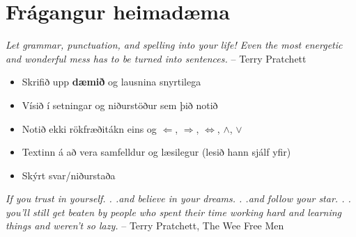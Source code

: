\documentclass[A4paper,10pt,icelandic]{sphinxmanual}
\begin{document}
\section{Frágangur heimadæma}
\label{vidauki:fragangur-heimadaema}
\emph{Let grammar, punctuation, and spelling into your life! Even the most energetic and wonderful mess has to be turned into sentences.}
-- Terry Pratchett
\begin{itemize}
\item {} 
Skrifið upp \textbf{dæmið} og lausnina snyrtilega

\item {} 
Vísið í setningar og niðurstöður sem þið notið

\item {} 
Notið ekki rökfræðitákn eins og \(\Leftarrow\), \(\Rightarrow\), \(\Leftrightarrow\), \(\wedge\), \(\vee\)

\item {} 
Textinn á að vera samfelldur og læsilegur (lesið hann sjálf yfir)

\item {} 
Skýrt svar/niðurstaða

\end{itemize}

\emph{If you trust in yourself. . .and believe in your dreams. . .and follow your star. . . you'll still get beaten by people who spent their time working hard and learning things and weren't so lazy.}
-- Terry Pratchett, The Wee Free Men
\end{document}
